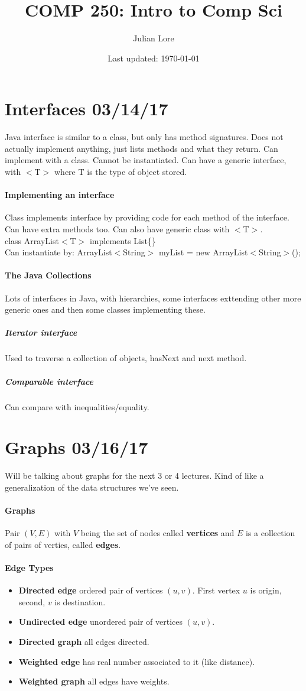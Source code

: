 \documentclass[12 pt]{article}
\author{Julian Lore}
\date{Last updated: \today}
\title{COMP 250: Intro to Comp Sci}
\theoremstyle{definition}
\begin{document}
	\onehalfspacing
	\maketitle
	\tableofcontents
	\section{Interfaces 03/14/17}
	Java interface is similar to a class, but only has method signatures. Does not actually implement anything, just lists methods and what they return. Can implement with a class. Cannot be instantiated. Can have a generic interface, with $<$T$>$ where T is the type of object stored.
	\paragraph{Implementing an interface}
	Class implements interface by providing code for each method of the interface. Can have extra methods too. Can also have generic class with $<$T$>$.
	\\class ArrayList$<$T$>$ implements List\{\}
	\\ Can instantiate by: ArrayList$<$String$>$ myList = new ArrayList$<$String$>$();
	\paragraph{The Java Collections} Lots of interfaces in Java, with hierarchies, some interfaces exttending other more generic ones and then some classes implementing these.
	\subparagraph{Iterator interface} Used to traverse a collection of objects, hasNext and next method.
	\subparagraph{Comparable interface} Can compare with inequalities/equality.
        \section{Graphs 03/16/17} Will be talking about graphs for the next 3 or 4 lectures. Kind of like a generalization of the data structures we've seen.
        \paragraph{Graphs} Pair $(V,E)$ with $V$ being the set of nodes called \textbf{vertices} and $E$ is a collection of pairs of verties, called \textbf{edges}.
        \paragraph{Edge Types}
        \begin{itemize}
        \item \textbf{Directed edge} ordered pair of vertices $(u,v)$. First vertex $u$ is origin, second, $v$ is destination.
        \item \textbf{Undirected edge} unordered pair of vertices $(u,v)$.
        \item \textbf{Directed graph} all edges directed.
        \item \textbf{Weighted edge} has real number associated to it (like distance).
          \item \textbf{Weighted graph} all edges have weights.
        \end{itemize}
\end{document}

